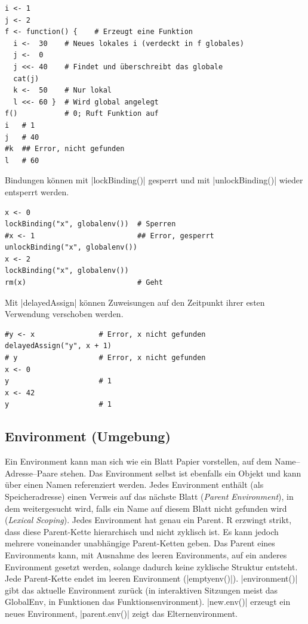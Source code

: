 \documentclass[10pt,twocolumn]{scrartcl}
\renewcommand{\lstinline}{\mycoloredinline}
\begin{document}
\begin{lstlisting}
i <- 1
j <- 2
f <- function() {    # Erzeugt eine Funktion
  i <-  30    # Neues lokales i (verdeckt in f globales)
  j <-  0
  j <<- 40    # Findet und überschreibt das globale
  cat(j)
  k <-  50    # Nur lokal
  l <<- 60 }  # Wird global angelegt
f()           # 0; Ruft Funktion auf
i   # 1
j   # 40
#k  ## Error, nicht gefunden
l   # 60
\end{lstlisting}

Bindungen können mit \lstinline|lockBinding()| gesperrt und mit \lstinline|unlockBinding()| wieder entsperrt werden.

\begin{lstlisting}
x <- 0
lockBinding("x", globalenv())  # Sperren
#x <- 1                        ## Error, gesperrt
unlockBinding("x", globalenv())
x <- 2
lockBinding("x", globalenv())
rm(x)                          # Geht
\end{lstlisting}

Mit \lstinline|delayedAssign| können Zuweisungen auf den Zeitpunkt
ihrer esten Verwendung verschoben werden.

\begin{lstlisting}
#y <- x               # Error, x nicht gefunden
delayedAssign("y", x + 1)
# y                   # Error, x nicht gefunden
x <- 0
y                     # 1
x <- 42
y                     # 1
\end{lstlisting}


\subsection{Environment (Umgebung)}

Ein Environment kann man sich wie ein Blatt Papier vorstellen, auf dem Name--Adresse--Paare stehen.
Das Environment selbst ist ebenfalls ein Objekt und kann über einen Namen referenziert werden. Jedes Environment enthält (als Speicheradresse) einen Verweis auf das nächste Blatt (\emph{Parent Environment}), in dem weitergesucht wird, falls ein Name auf diesem Blatt nicht gefunden wird (\emph{Lexical Scoping}).
Jedes Environment hat genau ein Parent. R erzwingt strikt, dass diese Parent-Kette hierarchisch und nicht zyklisch ist. Es kann jedoch mehrere voneinander unabhängige Parent-Ketten geben.
Das Parent eines Environments kann, mit Ausnahme des leeren Environments, auf ein anderes Environment gesetzt werden, solange dadurch keine zyklische Struktur entsteht.
Jede Parent-Kette endet im leeren Environment (\lstinline|emptyenv()|).
\lstinline|environment()| gibt das aktuelle Environment zurück (in interaktiven Sitzungen meist das GlobalEnv, in Funktionen das Funktionsenvironment).
\lstinline|new.env()| erzeugt ein neues Environment,
\lstinline|parent.env()| zeigt das Elternenvironment.
\end{document}
